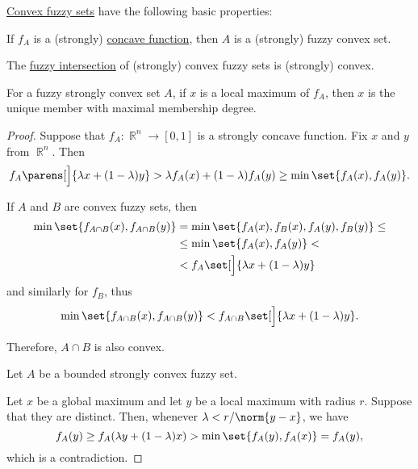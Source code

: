 \begin{proposition}\label{thm:def:fuzzy_convex_set}
  \hyperref[def:fuzzy_convex_set]{Convex fuzzy sets} have the following basic properties:
  \begin{thmenum}
     If \( f_A \) is a (strongly) \hyperref[def:convex_function]{concave function}, then \( A \) is a (strongly) fuzzy convex set.

     The \hyperref[def:basic_fuzzy_set_operations/intersection]{fuzzy intersection} of (strongly) convex fuzzy sets is (strongly) convex.

     For a fuzzy strongly convex set \( A \), if \( x \) is a local maximum of \( f_A \), then \( x \) is the unique member with maximal membership degree.
  \end{thmenum}
\end{proposition}
\begin{proof}
   Suppose that \( f_A: \BbbR^n \to [0, 1] \) is a strongly concave function. Fix \( x \) and \( y \) from \( \BbbR^n \). Then
  \begin{equation*}
    f_A\parens[\Big]{ \lambda x + (1 - \lambda) y }
    >
    \lambda f_A(x) + (1 - \lambda) f_A(y)
    \geq
    \min\set{ f_A(x), f_A(y) }.
  \end{equation*}

   If \( A \) and \( B \) are convex fuzzy sets, then
  \begin{align*}
    \min\set{ f_{A \cap B}(x), f_{A \cap B}(y) }
    &=
    \min\set{ f_A(x), f_B(x), f_A(y), f_B(y) }
    \leq \\ &\leq
    \min\set{ f_A(x), f_A(y) }
    < \\ &<
    f_A \set[\Big]{ \lambda x + (1 - \lambda) y }
  \end{align*}
  and similarly for \( f_B \), thus
  \begin{equation*}
    \min\set{ f_{A \cap B}(x), f_{A \cap B}(y) }
    <
    f_{A \cap B} \set[\Big]{ \lambda x + (1 - \lambda) y }.
  \end{equation*}

  Therefore, \( A \cap B \) is also convex.

   Let \( A \) be a bounded strongly convex fuzzy set.

  Let \( x \) be a global maximum and let \( y \) be a local maximum with radius \( r \). Suppose that they are distinct. Then, whenever \( \lambda < r / \norm{y - x} \), we have
  \begin{equation*}
    f_A(y)
    \geq
    f_A(\lambda y + (1 - \lambda) x)
    >
    \min\set{ f_A(y), f_A(x) }
    =
    f_A(y),
  \end{equation*}
  which is a contradiction.
\end{proof}

